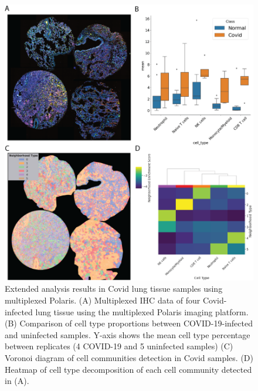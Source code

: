 \begin{figure}[hp]
\renewcommand{\figurename}{Figure}
    \centering
    \includegraphics[width=0.9\columnwidth]{Chapter3/Figures/Chap3_Apendix_covid.png}
    \caption[Analysis results in Covid tissue samples using multiplexed Polaris]{Extended analysis results in Covid lung tissue samples using multiplexed Polaris. (A) Multiplexed IHC data of four Covid-infected lung tissue using the multiplexed Polaris imaging platform. (B) Comparison of cell type proportions between COVID-19-infected and uninfected samples. Y-axis shows the mean cell type percentage between replicates (4 COVID-19 and 5 uninfected samples) (C) Voronoi diagram of cell communities detection in Covid samples. (D) Heatmap of cell type decomposition of each cell community detected in (A).}
    \label{fig:Chap3_Covid_project}
\end{figure}

